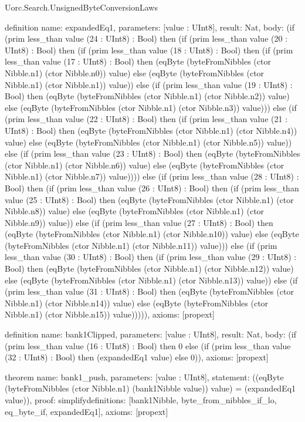 \begin{lexlean}{Uorc.Search.UnsignedByteConversionLaws}
\begin{semanticmodule}
definition{
  name: expandedEq1,
  parameters: [value : UInt8],
  result: Nat,
  body: (if (prim less_than value (24 : UInt8) : Bool) then (if (prim less_than value (20 : UInt8) : Bool) then (if (prim less_than value (18 : UInt8) : Bool) then (if (prim less_than value (17 : UInt8) : Bool) then (eqByte (byteFromNibbles (ctor Nibble.n1) (ctor Nibble.n0)) value) else (eqByte (byteFromNibbles (ctor Nibble.n1) (ctor Nibble.n1)) value)) else (if (prim less_than value (19 : UInt8) : Bool) then (eqByte (byteFromNibbles (ctor Nibble.n1) (ctor Nibble.n2)) value) else (eqByte (byteFromNibbles (ctor Nibble.n1) (ctor Nibble.n3)) value))) else (if (prim less_than value (22 : UInt8) : Bool) then (if (prim less_than value (21 : UInt8) : Bool) then (eqByte (byteFromNibbles (ctor Nibble.n1) (ctor Nibble.n4)) value) else (eqByte (byteFromNibbles (ctor Nibble.n1) (ctor Nibble.n5)) value)) else (if (prim less_than value (23 : UInt8) : Bool) then (eqByte (byteFromNibbles (ctor Nibble.n1) (ctor Nibble.n6)) value) else (eqByte (byteFromNibbles (ctor Nibble.n1) (ctor Nibble.n7)) value)))) else (if (prim less_than value (28 : UInt8) : Bool) then (if (prim less_than value (26 : UInt8) : Bool) then (if (prim less_than value (25 : UInt8) : Bool) then (eqByte (byteFromNibbles (ctor Nibble.n1) (ctor Nibble.n8)) value) else (eqByte (byteFromNibbles (ctor Nibble.n1) (ctor Nibble.n9)) value)) else (if (prim less_than value (27 : UInt8) : Bool) then (eqByte (byteFromNibbles (ctor Nibble.n1) (ctor Nibble.n10)) value) else (eqByte (byteFromNibbles (ctor Nibble.n1) (ctor Nibble.n11)) value))) else (if (prim less_than value (30 : UInt8) : Bool) then (if (prim less_than value (29 : UInt8) : Bool) then (eqByte (byteFromNibbles (ctor Nibble.n1) (ctor Nibble.n12)) value) else (eqByte (byteFromNibbles (ctor Nibble.n1) (ctor Nibble.n13)) value)) else (if (prim less_than value (31 : UInt8) : Bool) then (eqByte (byteFromNibbles (ctor Nibble.n1) (ctor Nibble.n14)) value) else (eqByte (byteFromNibbles (ctor Nibble.n1) (ctor Nibble.n15)) value))))),
  axioms: [propext]
}

definition{
  name: bank1Clipped,
  parameters: [value : UInt8],
  result: Nat,
  body: (if (prim less_than value (16 : UInt8) : Bool) then 0 else (if (prim less_than value (32 : UInt8) : Bool) then (expandedEq1 value) else 0)),
  axioms: [propext]
}

theorem{
  name: bank1_push,
  parameters: [value : UInt8],
  statement: ((eqByte (byteFromNibbles (ctor Nibble.n1) (bank1Nibble value)) value) = (expandedEq1 value)),
  proof: simplify{definitions: [bank1Nibble, byte_from_nibbles_if_lo, eq_byte_if, expandedEq1]},
  axioms: [propext]
}


\end{semanticmodule}
\end{lexlean}
